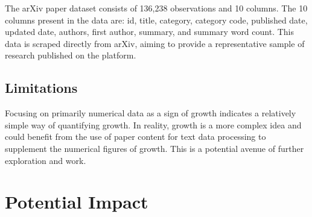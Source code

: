 \documentclass[
  12pt]{article}
\begin{document}
The arXiv paper dataset consists of 136,238 observations and 10 columns.
The 10 columns present in the data are: id, title, category, category
code, published date, updated date, authors, first author, summary, and
summary word count. This data is scraped directly from arXiv, aiming to
provide a representative sample of research published on the platform.

\subsection{Limitations}\label{limitations}

Focusing on primarily numerical data as a sign of growth indicates a
relatively simple way of quantifying growth. In reality, growth is a
more complex idea and could benefit from the use of paper content for
text data processing to supplement the numerical figures of growth. This
is a potential avenue of further exploration and work.

\section{Potential Impact}\label{impact}


\renewcommand\refname{References}
  
\end{document}
